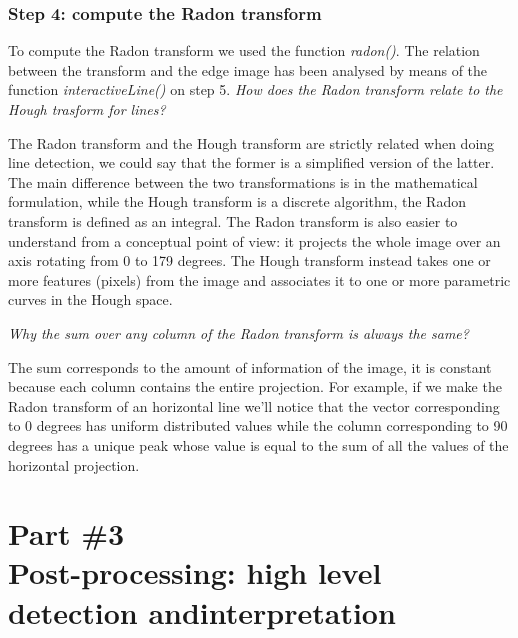 \documentclass[12pt,a4paper,oneside,final,titlepage,openany,onecolumn]{article}
\begin{document}
		\subsubsection*{Step 4: compute the Radon transform}
		\par
		To compute the Radon transform we used the function \textit{radon()}. The relation between the transform and the edge image has been analysed by means of the function \textit{interactiveLine()} on step 5.
		\vspace{\baselineskip}
		\newline
		\textit{How does the Radon transform relate to the Hough trasform for lines?}
		\vspace{0.5\baselineskip}
		\begin{adjustwidth}{0.5cm}{}
			The Radon transform and the Hough transform are strictly related when doing line detection, we could say that the former is a simplified version of the latter.
			\newline
			The main difference between the two transformations is in the mathematical formulation, while the Hough transform is a discrete algorithm, the Radon transform is defined as an integral.
			\newline
			The Radon transform is also easier to understand from a conceptual point of view: it projects the whole image over an axis rotating from 0 to 179 degrees. The Hough transform instead takes one or more features (pixels) from the image and associates it to one or more parametric curves in the Hough space.
		\end{adjustwidth}
		\vspace{\baselineskip}
		\textit{Why the sum over any column of the Radon transform is always the same?}
		\vspace{0.5\baselineskip}
		\begin{adjustwidth}{0.5cm}{}
			The sum corresponds to the amount of information of the image, it is constant because each column contains the entire projection. For example, if we make the Radon transform of an horizontal line we'll notice that the vector corresponding to 0 degrees has uniform distributed values while the column corresponding to 90 degrees has a unique peak whose value is equal to the sum of all the values of the horizontal projection.
		
		\end{adjustwidth}
	\section*{{\small Part \#3} \\ Post-processing: high level detection and\linebreak interpretation}
\end{document}
